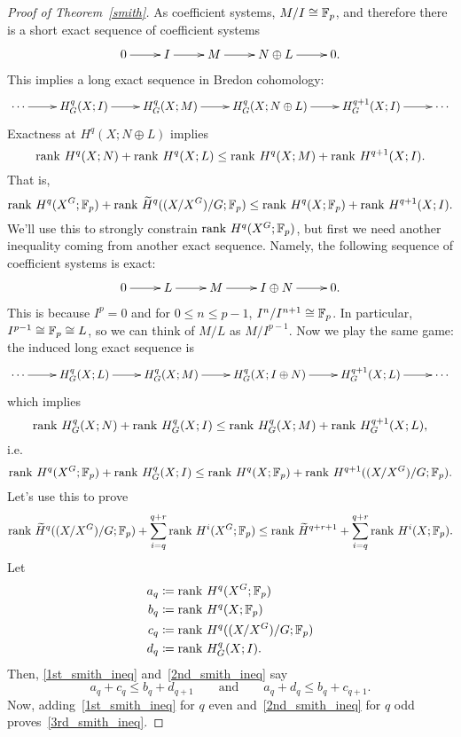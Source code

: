 \begin{proof}[Proof of Theorem~\ref{smith}]
As coefficient systems, $M/I\cong\mathbb F_p$, and therefore there is a short exact sequence of coefficient systems
\[\shortexact{I}{M}{N\oplus L}.\]
This implies a long exact sequence in Bredon cohomology:
\[\xymatrix{
	\dotsb\ar[r] & H_G^q(X;I)\ar[r] & H_G^q(X;M)\ar[r] & H_G^q(X;N\oplus L)\ar[r] & H_G^{q+1}(X;I)\ar[r] & \dotsb
}\]
Exactness at $H^q(X;N\oplus L)$ implies
\[\operatorname{rank\,} H^q(X;N) + \operatorname{rank\,} H^q(X;L) \le \operatorname{rank\,} H^q(X;M) + \operatorname{rank\,} H^{q+1}(X;I).\]
That is,
\begin{equation}
\label{1st_smith_ineq}
\operatorname{rank\,} H^q(X^G;\mathbb F_p) + \operatorname{rank\,}\widetilde H^q((X/X^G)/G;\mathbb F_p) \le \operatorname{rank\,} H^q(X;\mathbb F_p) + \operatorname{rank\,} H^{q+1}(X;I).
\end{equation}
We'll use this to strongly constrain $\operatorname{rank\,} H^q(X^G;\mathbb F_p)$, but first we need another inequality coming from
another exact sequence. Namely, the following sequence of coefficient systems is exact:
\[\shortexact{L}{M}{I\oplus N}.\]
This is because $I^p = 0$ and for $0\le n\le p-1$, $I^n/I^{n+1}\cong\mathbb F_p$. In particular, $I^{p-1}\cong\mathbb F_p\cong
L$, so we can think of $M/L$ as $M/I^{p-1}$. Now we play the same game: the induced long exact sequence is
\[\xymatrix{
	\dotsb\ar[r] & H_G^q(X;L)\ar[r] & H_G^q(X;M)\ar[r] & H_G^q(X;I\oplus N)\ar[r] & H_G^{q+1}(X;L)\ar[r] & \dotsb
}\]
which implies
\[\operatorname{rank\,} H_G^q(X;N) + \operatorname{rank\,} H_G^q(X;I) \le \operatorname{rank\,} H_G^q(X;M) + \operatorname{rank\,} H_G^{q+1}(X;L),\]
i.e.
\begin{equation}
\label{2nd_smith_ineq}
\operatorname{rank\,} H^q(X^G;\mathbb F_p) + \operatorname{rank\,} H_G^q(X;I) \le \operatorname{rank\,} H^q(X;\mathbb F_p) + \operatorname{rank\,} H^{q+1}((X/X^G)/G;\mathbb F_p).
\end{equation}
Let's use this to prove
\begin{equation}
\label{3rd_smith_ineq}
\operatorname{rank\,} \widetilde H^q((X/X^G)/G;\mathbb F_p) + \sum_{i=q}^{q+r} \operatorname{rank\,} H^i(X^G;\mathbb F_p) \le \operatorname{rank\,}\widetilde H^{q+r+1} + \sum_{i=q}^{q+r}\operatorname{rank\,}
H^i(X;\mathbb F_p).
\end{equation}
Let
\begin{align*}
	a_q &\coloneqq \operatorname{rank\,} H^q(X^G;\mathbb F_p)\\
	b_q &\coloneqq \operatorname{rank\,} H^q(X;\mathbb F_p)\\
	c_q &\coloneqq \operatorname{rank\,} H^q((X/X^G)/G;\mathbb F_p)\\
	d_q &\coloneqq \operatorname{rank\,} H_G^q(X;I).
\end{align*}
Then, \eqref{1st_smith_ineq} and~\eqref{2nd_smith_ineq} say
\[a_q + c_q\le b_q + d_{q+1}\qquad\text{and}\qquad a_q + d_q \le b_q + c_{q+1}.\]
Now, adding~\eqref{1st_smith_ineq} for $q$ even and~\eqref{2nd_smith_ineq} for $q$ odd
proves~\eqref{3rd_smith_ineq}.


\end{proof}
